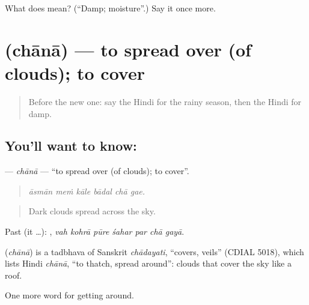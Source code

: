 \begin{tcolorbox}[breakable,colback=teal!4,colframe=teal!35!black,title={Before you move on}]
What does  mean? (\textquotedblleft{}Damp; moisture\textquotedblright{}.) Say it once more.
\end{tcolorbox}
\section[\texorpdfstring{\hi{छाना} (chānā)}{छाना (chānā)}]{ (chānā) — to spread over (of clouds); to cover}

\label{lesson:HI-C437-chana}



\begin{quote}
Before the new one: say the Hindi for the rainy season, then the Hindi for damp.
\end{quote}

\subsection*{You'll want to know: }
\textbf{} — \emph{chānā} — \textquotedblleft{}to spread over (of clouds); to cover\textquotedblright{}.

\begin{quote}
     
\end{quote}

\begin{quote}
\emph{āsmān meṁ kāle bādal chā gae.}
\end{quote}

\begin{quote}
Dark clouds spread across the sky.
\end{quote}

Past (it …):       , \emph{vah kohrā pūre śahar par chā gayā}.

\begin{cousinweb}
\textbf{} (\emph{chānā}) is a tadbhava of Sanskrit \emph{chādayati}, \textquotedblleft{}covers, veils\textquotedblright{} (CDIAL 5018), which lists Hindi \emph{chānā}, \textquotedblleft{}to thatch, spread around\textquotedblright{}: clouds that   cover the sky like a roof.
\end{cousinweb}

\begin{grammarlens}[title={What you've built}]
One more word for getting around.
\end{grammarlens}

